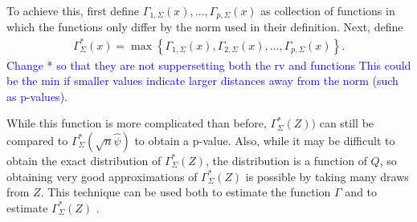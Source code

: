\documentclass{article}
\newcommand{\vmat}{\Sigma}
\newcommand{\norm}{f}
\newcommand{\rvv}{Z}
\newcommand{\distv}{Q}
\begin{document}
To achieve this, first define $\Gamma_{1, \vmat}(x), \dots, \Gamma_{p, \vmat}(x)$ as collection of functions in which the functions only differ by the norm used in their definition. Next, define
\begin{align*}
	\Gamma^*_\vmat(x) = \max\left\{\Gamma_{1, \vmat}(x), \Gamma_{2, \vmat}(x), \dots, \Gamma_{p, \vmat}(x)\right\}.
\end{align*}
\textcolor{blue}{Change * so that they are not suppersetting both the rv and functions}
\textcolor{blue}{This could be the min if smaller values indicate larger distances away from the norm (such as p-values).}  

While this function is more complicated than before,  $\Gamma^*_{\vmat}(\rvv))$ can still be compared to $\Gamma^*_{\vmat}(\sqrt{n}\hat{\psi})$ to obtain a p-value. Also, while it may be difficult to obtain the exact distribution of $\Gamma_\vmat^*(\rvv)$, the distribution is a function of $\distv$, so obtaining very good approximations of $\Gamma_\vmat^*(\rvv)$ is possible by taking many draws from $\rvv$. This technique can be used both to estimate the function $\Gamma$ and to estimate $\Gamma^*_\vmat(\rvv)$ .


\end{document}
